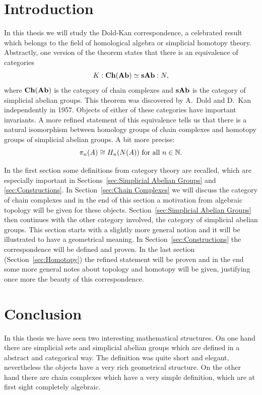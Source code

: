 \documentclass[titlepage, 11pt]{amsproc}
\theoremstyle{plain}
\theoremstyle{definition}
\begin{document}
\section*{Introduction}
In this thesis we will study the Dold-Kan correspondence, a celebrated result which belongs to the field of homological algebra or simplicial homotopy theory. Abstractly, one version of the theorem states that there is an equivalence of categories
$$ K: \mathbf{Ch}(\mathbf{Ab}) \simeq \mathbf{sAb} :N, $$
where $\mathbf{Ch}(\mathbf{Ab})$ is the category of chain complexes and $\mathbf{sAb}$ is the category of simplicial abelian groups. This theorem was discovered by A.~Dold \cite{dold} and D.~Kan \cite{kan} independently in 1957. Objects of either of these categories have important invariants. A more refined statement of this equivalence tells us that there is a natural isomorphism between homology groups of chain complexes and homotopy groups of simplicial abelian groups. A bit more precise:
$$ \pi_n(A) \cong H_n(N(A)) \text{ for all } n \in \mathbb{N}. $$

In the first section some definitions from category theory are recalled, which are especially important in Sections~\ref{sec:Simplicial Abelian Groups} and \ref{sec:Constructions}. In Section~\ref{sec:Chain Complexes} we will discuss the category of chain complexes and in the end of this section a motivation from algebraic topology will be given for these objects. Section~\ref{sec:Simplicial Abelian Groups} then continues with the other category involved, the category of simplicial abelian groups. This section starts with a slightly more general notion and it will be illustrated to have a geometrical meaning. In Section~\ref{sec:Constructions} the correspondence will be defined and proven. In the last section (Section~\ref{sec:Homotopy}) the refined statement will be proven and in the end some more general notes about topology and homotopy will be given, justifying once more the beauty of this correspondence.

\newpage


\newpage


\newpage


\newpage


\newpage


\newpage
\section*{Conclusion}
In this thesis we have seen two interesting mathematical structures. On one hand there are simplicial sets and simplicial abelian groups which are defined in a abstract and categorical way. The definition was quite short and elegant, nevertheless the objects have a very rich geometrical structure. On the other hand there are chain complexes which have a very simple definition, which are at first sight completely algebraic.
\end{document}
